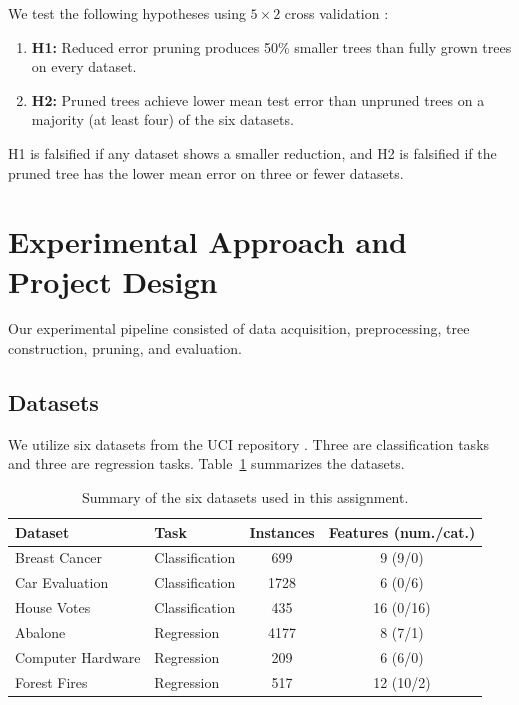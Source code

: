 \documentclass[twoside,11pt]{article}
\begin{document}
We test the following hypotheses using $5 \times 2$ cross validation \citep{alpaydin2020}:
\begin{enumerate}
    \item \textbf{H1:} Reduced error pruning produces 50\% smaller trees than fully grown trees on every dataset.
    \item \textbf{H2:} Pruned trees achieve lower mean test error than unpruned trees on a majority (at least four) of the six datasets.
\end{enumerate}
H1 is falsified if any dataset shows a smaller reduction, and H2 is falsified if the pruned tree has the lower mean error on three or fewer datasets.


\section{Experimental Approach and Project Design}
Our experimental pipeline consisted of data acquisition, preprocessing, tree construction, pruning, and evaluation.

\subsection{Datasets}
We utilize six datasets from the UCI repository \citep{uci_repository}. Three are classification tasks and three are regression tasks. Table~\ref{tab:datasets} summarizes the datasets.

\begin{table}[h]
    \centering
    \begin{tabular}{llcc}
    \hline
    Dataset & Task & Instances & Features (num./cat.) \\
    \hline
    Breast Cancer     & Classification & 699  & 9 (9/0) \\
    Car Evaluation    & Classification & 1728 & 6 (0/6) \\
    House Votes       & Classification & 435  & 16 (0/16) \\
    Abalone           & Regression     & 4177 & 8 (7/1) \\
    Computer Hardware & Regression     & 209  & 6 (6/0) \\
    Forest Fires      & Regression     & 517  & 12 (10/2) \\
    \hline
    \end{tabular}
    \caption{Summary of the six datasets used in this assignment.}
    \label{tab:datasets}
\end{table}
\end{document}
